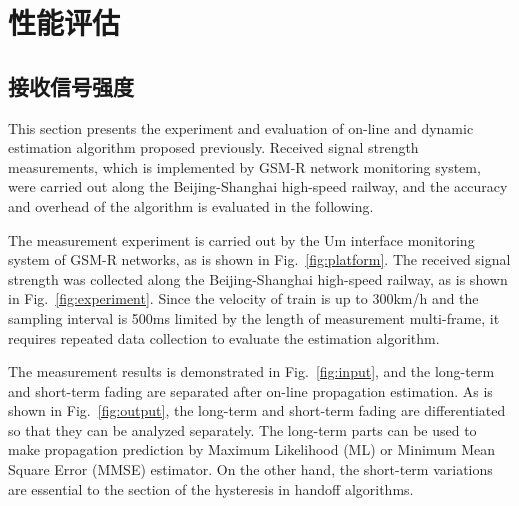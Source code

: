 

\chapter{性能评估}
\label{chap:evaluation}

\section{接收信号强度}
\label{sec:rss}

This section presents the experiment and evaluation of on-line and dynamic estimation algorithm proposed previously. Received signal strength measurements, which is implemented by GSM-R network monitoring system, were carried out along the Beijing-Shanghai high-speed railway, and the accuracy and overhead of the algorithm is evaluated in the following.

The measurement experiment is carried out by the Um interface monitoring system of GSM-R networks, as is shown in Fig.~\ref{fig:platform}. The received signal strength was collected along the Beijing-Shanghai high-speed railway, as is shown in Fig.~\ref{fig:experiment}. Since the velocity of train is up to 300km/h and the sampling interval is 500ms limited by the length of measurement multi-frame, it requires repeated data collection to evaluate the estimation algorithm.


The measurement results is demonstrated in Fig.~\ref{fig:input}, and the long-term and short-term fading are separated after on-line propagation estimation. As is shown in Fig.~\ref{fig:output}, the long-term and short-term fading are differentiated so that they can be analyzed separately. The long-term parts can be used to make propagation prediction by Maximum Likelihood (ML) or Minimum Mean Square Error (MMSE) estimator. On the other hand, the short-term variations are essential to the section of the hysteresis in handoff algorithms.

